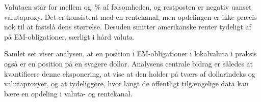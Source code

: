 \documentclass[11pt,a4paper]{article}
\begin{document}
Valutaen står for mellem \AndelMin{} og \AndelMax\,\% af følsomheden, og restposten er negativ uanset valutaproxy. Det er konsistent med en rentekanal, men opdelingen er ikke præcis nok til at fastslå dens størrelse. \KonklAsym{} \KonklSignal{} Desuden smitter amerikanske renter tydeligt af på EM-obligationer, særligt i hård valuta.

Samlet set viser analysen, at en position i EM-obligationer i lokalvaluta i praksis også er en position på en svagere dollar. Analysens centrale bidrag er således at kvantificere denne eksponering, at vise at den holder på tværs af dollarindeks og valutaproxyer, og at tydeliggøre, hvor langt de offentligt tilgængelige data kan bære en opdeling i valuta- og rentekanal.



\end{document}
